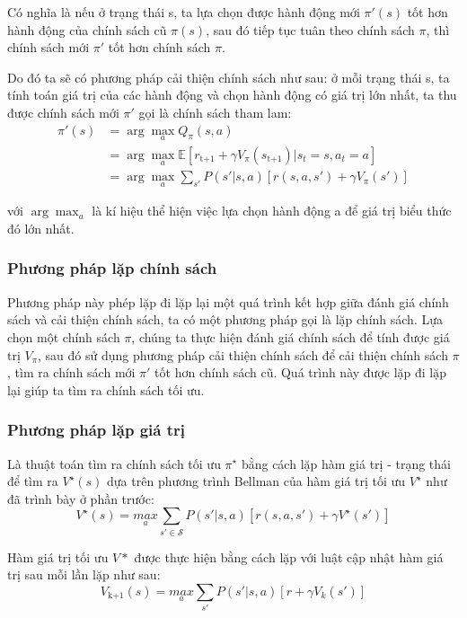 \documentclass{uetgraduation}
\begin{document}
Có nghĩa là nếu ở trạng thái s, ta lựa chọn được hành động mới $\pi'(s)$ tốt hơn hành động của chính sách cũ $\pi(s)$, sau đó tiếp tục tuân theo chính sách $\pi$, thì chính sách mới
$\pi'$ tốt hơn chính sách $\pi$.

Do đó ta sẽ có phương pháp cải thiện chính sách như sau: ở mỗi trạng thái s, ta tính toán giá trị của các hành động và chọn hành động có giá trị lớn nhất, ta thu được chính sách mới
$\pi'$ gọi là chính sách tham lam:
\begin{equation}
    \begin{split}
        \pi' (s) &= \arg \max_{a} Q_\pi (s, a) \\
        &= \arg \max_{a} \mathbb{E} [r_\text{t+1} + \gamma V_\pi (s_\text{t+1}) | s_t = s, a_t = a] \\
        &= \arg \max_{a} \sum_{s'} P(s' | s, a) [r(s, a, s') + \gamma V_\pi(s')]
    \end{split}
\end{equation}

với $\arg \max_{a}$ là kí hiệu thể hiện việc lựa chọn hành động a để giá trị biểu thức đó lớn nhất.

\subsubsection{Phương pháp lặp chính sách}
Phương pháp này phép lặp đi lặp lại một quá trình kết hợp giữa đánh giá chính sách và cải thiện chính sách, ta có một phương pháp gọi là lặp chính sách. 
Lựa chọn một chính sách $\pi$, chúng ta thực hiện đánh giá chính sách để tính được giá trị $V_\pi$, sau đó sử dụng phương pháp cải thiện chính sách để cải thiện chính sách 
$\pi$, tìm ra chính sách mới $\pi'$ tốt hơn chính sách cũ. Quá trình này được lặp đi lặp lại giúp ta tìm ra chính sách tối ưu.

\subsubsection{Phương pháp lặp giá trị}
Là thuật toán tìm ra chính sách tối ưu $\pi^\star$ bằng cách lặp hàm giá trị - trạng thái để tìm ra $V^\star (s)$ dựa trên phương trình Bellman của hàm giá trị tối ưu $V^\star$ như đã trình bày
ở phần trước:
\begin{equation}
    V^\star (s) = \underset{a}{max } \sum_{s' \in \mathcal{S}} P(s' | s, a) [r(s, a, s') + \gamma V^\star (s')]
\end{equation}

Hàm giá trị tối ưu $V*$ được thực hiện bằng cách lặp với luật cập nhật hàm giá trị sau mỗi lần lặp như sau:
\begin{equation}
    V_\text{k+1} (s) = \underset{a}{max } \sum_{s'} P(s' | s, a) [r + \gamma V_k (s')]
\end{equation}
\end{document}
